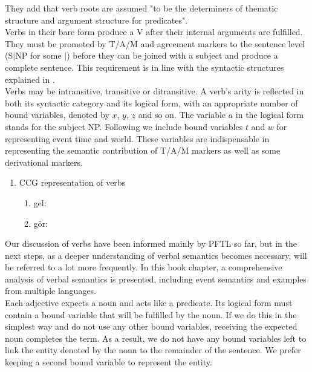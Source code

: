 \documentclass[11pt]{article} %
\begin{document}
They add that verb roots are assumed "to be the determiners of thematic structure and argument structure for predicates". \\

Verbs in their bare form produce a V after their internal arguments are fulfilled. They must be promoted by T/A/M and agreement markers to the sentence level (S$\vert$NP for some $\vert$) before they can be joined with a subject and produce a complete sentence. This requirement is in line with the syntactic structures explained in \citet{Cowper1992}. \\

Verbs may be intransitive, transitive or ditransitive. A verb's arity is reflected in both its syntactic category and its logical form, with an appropriate number of bound variables, denoted by $x$, $y$, $z$ and so on. The variable $a$ in the logical form stands for the subject NP. Following \citet{MoensSteedman1988} we include bound variables $t$ and $w$ for representing event time and world. These variables are indispensable in representing the semantic contribution of T/A/M markers as well as some derivational markers.

\begin{enumerate}[resume*]
	\item CCG representation of verbs
	\begin{enumerate}[label=(\alph*), ref=(\alph*)]\itemsep1pt
	\item gel: 
	\item gör: 
	\end{enumerate}
\end{enumerate}

Our discussion of verbs have been informed mainly by PFTL so far, but in the next steps, as a deeper understanding of verbal semantics becomes necessary, \citet{VanValin2006} will be referred to a lot more frequently. In this book chapter, a comprehensive analysis of verbal semantics is presented, including event semantics and examples from multiple languages. \\

Each adjective expects a noun and acts like a predicate. Its logical form must contain a bound variable that will be fulfilled by the noun. If we do this in the simplest way and do not use any other bound variables, receiving the expected noun completes the term. As a result, we do not have any bound variables left to link the entity denoted by the noun to the remainder of the sentence. We prefer keeping a second bound variable to represent the entity. \\
\end{document}
